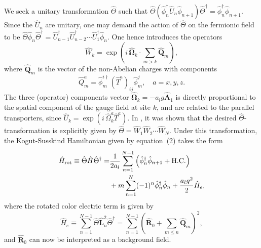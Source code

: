 \documentclass[twocolumn,aps,showpacs,prb,superscriptaddress,floatfix,10pt,nofootinbib]{revtex4-2}
\begin{document}
We seek a unitary transformation $\hat{\Theta}$ such that $\hat{\Theta} \left(\hat{\phi}_{n}^{\dagger}\hat{U}_{n}\hat{\phi}_{n+1}\right) \hat{\Theta}^{\dagger} =\hat{\phi}_{n}^{{\dagger}}\hat{\phi}_{n+1}$. Since the $\hat{U}_{n}$ are unitary, one may demand the action of $\hat{\Theta}$ on the fermionic field to be $\hat{\Theta} \hat{\phi}_{n}\hat{\Theta}^{\dagger} =\hat{U}_{n-1}^{\dagger}\hat{U}_{n-2}^{\dagger}\cdots \hat{U}_{1}^{\dagger} \hat{\phi}_{n}$.
One hence introduces the operators
\begin{equation}
\hat{W}_{k}=\exp \left(i\, \hat{\boldsymbol{{\Omega}}}_{k}\cdot\sum_{m>k} \hat{\boldsymbol{Q}}_{m}\right),
\end{equation}
where $\hat{\boldsymbol{Q}}_{m}$ is the vector of the non-Abelian charges with components
\begin{equation}
\hat{Q}_{m}^{a}=\hat{\phi}_{m}^{i\dagger}(\hat{T}^{a})_{ij}\hat{\phi}_{m}^{j}, \quad a=x,y,z. \label{si:nonabeliancharges}
\end{equation}
The three (operator) components vector $\hat{\boldsymbol{{\Omega}}}_{k}= -a_l g\boldsymbol{\hat{A}}_{1}$ is directly proportional to the spatial component of the gauge field at site $k$, and are related to the parallel transporters, since $\hat{U}_{k}=\exp\left( i \, \hat{\Omega}_{k}^{a}\hat{T}^{a} \right)$. In \cite{sala_variational_2018}, it was shown that the desired $\hat{\Theta}$-transformation is explicitly given by $\hat{\Theta}=\hat{W}_{1}\hat{W}_{2}\cdots \hat{W}_{N}$. Under this transformation, the Kogut-Susskind Hamiltonian given by equation~(2)  takes the form
\begin{align}
\notag \hat{H}_{\text{rot}}\equiv\hat{\Theta} \hat{H} \hat{\Theta}^{\dagger}=&\frac{1}{2a_l} \sum_{n=1}^{N-1}\left( \hat{\phi}_{n}^{{\dagger}}\hat{\phi}_{n+1}+\mathrm{H.C.}\right) \\
& +m\sum_{n=1}^{N}(-1)^{n}\hat{\phi}_{n}^{\dagger}\hat{\phi}_{n}+\frac{a_l g^{2}}{2} \hat{H}_{e}, \label{SIeqrotatedHam}
\end{align}
where the rotated color electric term is given by
\begin{equation}
\hat{H}_{e}\equiv \sum_{n=1}^{N-1}\hat{\Theta} \hat{\boldsymbol{L}}_{n}^{2} \hat{\Theta}^{\dagger}= \sum_{n=1}^{N-1}\left(\hat{\boldsymbol{R}}_{0}+\sum_{m\leq n}\hat{\boldsymbol{Q}}_{m}\right)^{2}, \label{SIeq:rotatedelec}
\end{equation}
and $\hat{\boldsymbol{R}}_{0}$ can now be interpreted as a background field.
\end{document}
